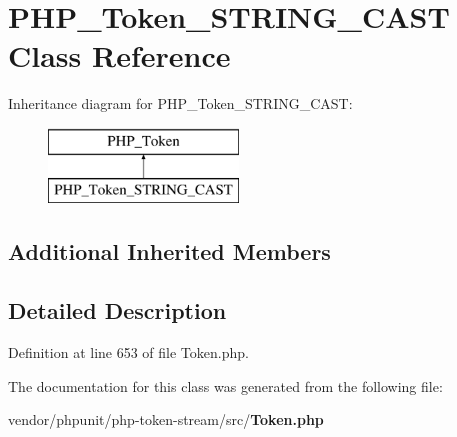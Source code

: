 \section{P\+H\+P\+\_\+\+Token\+\_\+\+S\+T\+R\+I\+N\+G\+\_\+\+C\+A\+S\+T Class Reference}
\label{class_p_h_p___token___s_t_r_i_n_g___c_a_s_t}
Inheritance diagram for P\+H\+P\+\_\+\+Token\+\_\+\+S\+T\+R\+I\+N\+G\+\_\+\+C\+A\+S\+T\+:\begin{figure}[H]
\begin{center}
\leavevmode
\includegraphics[height=2.000000cm]{class_p_h_p___token___s_t_r_i_n_g___c_a_s_t}
\end{center}
\end{figure}
\subsection*{Additional Inherited Members}


\subsection{Detailed Description}


Definition at line 653 of file Token.\+php.



The documentation for this class was generated from the following file\+:\begin{DoxyCompactItemize}
\item 
vendor/phpunit/php-\/token-\/stream/src/{\bf Token.\+php}\end{DoxyCompactItemize}
